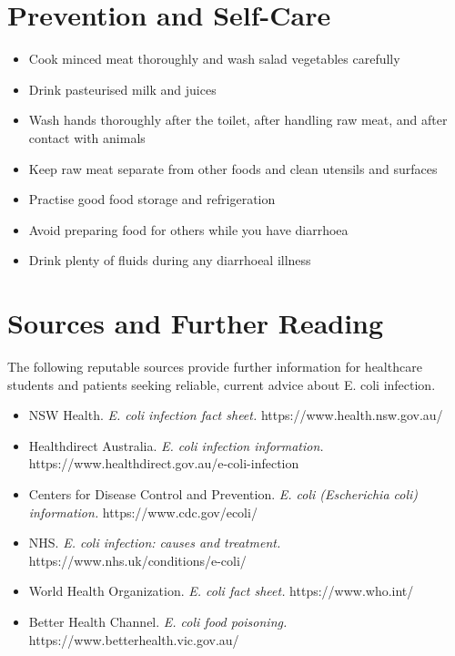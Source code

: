 \section*{Prevention and Self-Care}
\begin{itemize}
    \item Cook minced meat thoroughly and wash salad vegetables carefully
    \item Drink pasteurised milk and juices
    \item Wash hands thoroughly after the toilet, after handling raw meat, and after contact with animals
    \item Keep raw meat separate from other foods and clean utensils and surfaces
    \item Practise good food storage and refrigeration
    \item Avoid preparing food for others while you have diarrhoea
    \item Drink plenty of fluids during any diarrhoeal illness
\end{itemize}

\section*{Sources and Further Reading}
The following reputable sources provide further information for healthcare students and patients seeking reliable, current advice about E. coli infection.
\begin{itemize}
    \item NSW Health. \textit{E. coli infection fact sheet.} https://www.health.nsw.gov.au/
    \item Healthdirect Australia. \textit{E. coli infection information.} https://www.healthdirect.gov.au/e-coli-infection
    \item Centers for Disease Control and Prevention. \textit{E. coli (Escherichia coli) information.} https://www.cdc.gov/ecoli/
    \item NHS. \textit{E. coli infection: causes and treatment.} https://www.nhs.uk/conditions/e-coli/
    \item World Health Organization. \textit{E. coli fact sheet.} https://www.who.int/
    \item Better Health Channel. \textit{E. coli food poisoning.} https://www.betterhealth.vic.gov.au/
\end{itemize}
